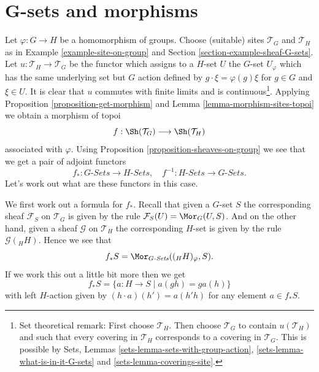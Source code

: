 \section{G-sets and morphisms}
\label{section-G-sets-morphisms}

\noindent
Let $\varphi : G \to H$ be a homomorphism of groups.
Choose (suitable) sites $\mathcal{T}_G$ and $\mathcal{T}_H$ as in
Example \ref{example-site-on-group} and
Section \ref{section-example-sheaf-G-sets}.
Let $u : \mathcal{T}_H \to \mathcal{T}_G$ be the functor which assigns
to a $H$-set $U$ the $G$-set $U_\varphi$ which has the same underlying
set but $G$ action defined by $g \cdot \xi = \varphi(g)\xi$ for
$g \in G$ and $\xi \in U$.
It is clear that $u$ commutes with finite limits and is
continuous\footnote{Set theoretical remark: First choose $\mathcal{T}_H$.
Then choose $\mathcal{T}_G$ to contain $u(\mathcal{T}_H)$ and such that
every covering in $\mathcal{T}_H$ corresponds to a covering in
$\mathcal{T}_G$. This is possible by
Sets, Lemmas
\ref{sets-lemma-sets-with-group-action},
\ref{sets-lemma-what-is-in-it-G-sets} and
\ref{sets-lemma-coverings-site}.}.
Applying
Proposition \ref{proposition-get-morphism}
and
Lemma \ref{lemma-morphism-sites-topoi}
we obtain a morphism of topoi
$$
f : \Sh(\mathcal{T}_G) \longrightarrow \Sh(\mathcal{T}_H)
$$
associated with $\varphi$. Using
Proposition \ref{proposition-sheaves-on-group}
we see that we get a pair of adjoint functors
$$
f_* : G\textit{-Sets} \longrightarrow H\textit{-Sets}, \quad
f^{-1} : H\textit{-Sets} \longrightarrow G\textit{-Sets}.
$$
Let's work out what are these functors in this case.

\medskip\noindent
We first work out a formula for $f_*$.
Recall that given a $G$-set $S$ the corresponding sheaf
$\mathcal{F}_S$ on $\mathcal{T}_G$ is given by the rule
$\mathcal{F}_S(U) = \Mor_G(U, S)$. And on the other hand, given
a sheaf $\mathcal{G}$ on $\mathcal{T}_H$ the corresponding $H$-set
is given by the rule $\mathcal{G}({}_HH)$. Hence we see that
$$
f_*S = \Mor_{G\textit{-Sets}}(({}_HH)_\varphi, S).
$$
If we work this out a little bit more then we get
$$
f_*S = \{ a : H \to S \mid a(gh) = ga(h) \}
$$
with left $H$-action given by
$(h \cdot a)(h') = a(h'h)$
for any element $a \in f_*S$.


